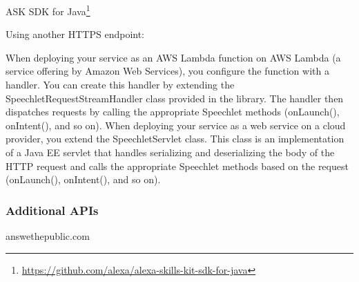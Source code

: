 ASK SDK for Java\footnote{\url{https://github.com/alexa/alexa-skills-kit-sdk-for-java}}



Using another HTTPS endpoint:

When deploying your service as an AWS Lambda function on AWS Lambda (a service offering by Amazon Web Services), you configure the function with a handler. You can create this handler by extending the SpeechletRequestStreamHandler class provided in the library. The handler then dispatches requests by calling the appropriate Speechlet methods (onLaunch(), onIntent(), and so on).
When deploying your service as a web service on a cloud provider, you extend the SpeechletServlet class. This class is an implementation of a Java EE servlet that handles serializing and deserializing the body of the HTTP request and calls the appropriate Speechlet methods based on the request (onLaunch(), onIntent(), and so on).




\subsubsection*{Additional APIs}





answethepublic.com








